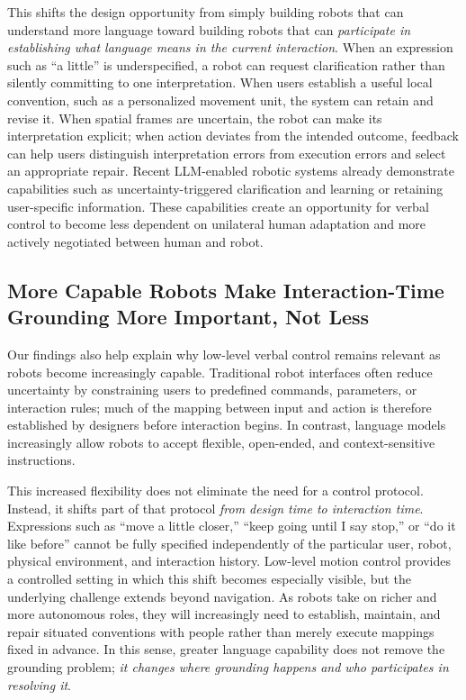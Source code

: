 This shifts the design opportunity from simply building robots that can understand more language toward building robots that can \textit{participate in establishing what language means in the current interaction}. When an expression such as ``a little'' is underspecified, a robot can request clarification rather than silently committing to one interpretation. When users establish a useful local convention, such as a personalized movement unit, the system can retain and revise it. When spatial frames are uncertain, the robot can make its interpretation explicit; when action deviates from the intended outcome, feedback can help users distinguish interpretation errors from execution errors and select an appropriate repair. Recent LLM-enabled robotic systems already demonstrate capabilities such as uncertainty-triggered clarification and learning or retaining user-specific information. \citep{ren2023knowno, wu2023tidybot} These capabilities create an opportunity for verbal control to become less dependent on unilateral human adaptation and more actively negotiated between human and robot.

\subsection{More Capable Robots Make Interaction-Time Grounding More Important, Not Less}

Our findings also help explain why low-level verbal control remains relevant as robots become increasingly capable. Traditional robot interfaces often reduce uncertainty by constraining users to predefined commands, parameters, or interaction rules; much of the mapping between input and action is therefore established by designers before interaction begins. \citep{fong2003questions, marge2010routes} In contrast, language models increasingly allow robots to accept flexible, open-ended, and context-sensitive instructions. \citep{ichter2023saycan, driess2023palme, brohan2023rt2}

This increased flexibility does not eliminate the need for a control protocol. Instead, it shifts part of that protocol \textit{from design time to interaction time}. Expressions such as ``move a little closer,'' ``keep going until I say stop,'' or ``do it like before'' cannot be fully specified independently of the particular user, robot, physical environment, and interaction history. Low-level motion control provides a controlled setting in which this shift becomes especially visible, but the underlying challenge extends beyond navigation. As robots take on richer and more autonomous roles, they will increasingly need to establish, maintain, and repair situated conventions with people rather than merely execute mappings fixed in advance. In this sense, greater language capability does not remove the grounding problem; \textit{it changes where grounding happens and who participates in resolving it}.

